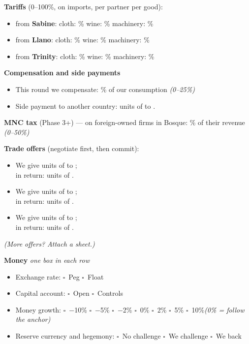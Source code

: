 \documentclass[11pt]{article}
\newcommand{\blank}[1]{\underline{\hspace{#1}}}
\newcommand{\boxx}{$\square$}
\begin{document}
{\bfseries Tariffs} (0--100\%, on imports, per partner per good):\par
\begin{itemize}[nosep,leftmargin=1.4em]
  \item from \textbf{Sabine}: \quad cloth: \blank{1.4cm}\% \quad wine: \blank{1.4cm}\% \quad machinery: \blank{1.4cm}\%
  \item from \textbf{Llano}: \quad cloth: \blank{1.4cm}\% \quad wine: \blank{1.4cm}\% \quad machinery: \blank{1.4cm}\%
  \item from \textbf{Trinity}: \quad cloth: \blank{1.4cm}\% \quad wine: \blank{1.4cm}\% \quad machinery: \blank{1.4cm}\%
\end{itemize}

{\bfseries Compensation and side payments}\par
\begin{itemize}[nosep,leftmargin=1.4em]
  \item This round we compensate: \blank{1.4cm}\% of our consumption \quad \textit{(0--25\%)}
  \item Side payment to another country: \blank{1.6cm} units of \blank{2cm} to \blank{2.2cm}.
\end{itemize}

{\bfseries MNC tax} (Phase 3+) --- on foreign-owned firms in Bosque: \blank{1.4cm}\% of their revenue \quad \textit{(0--50\%)}\par

{\bfseries Trade offers} (negotiate first, then commit):\par
\begin{itemize}[itemsep=4pt,leftmargin=1.4em]
  \item We give \blank{1.8cm} units of \blank{2.2cm} to \blank{2.2cm};\\[2pt] in return: \blank{1.8cm} units of \blank{2.2cm}.
  \item We give \blank{1.8cm} units of \blank{2.2cm} to \blank{2.2cm};\\[2pt] in return: \blank{1.8cm} units of \blank{2.2cm}.
  \item We give \blank{1.8cm} units of \blank{2.2cm} to \blank{2.2cm};\\[2pt] in return: \blank{1.8cm} units of \blank{2.2cm}.
\end{itemize}
\textit{(More offers? Attach a sheet.)}

{\bfseries Money} \hfill \textit{one box in each row}\par
\begin{itemize}[nosep,leftmargin=1.4em]
  \item Exchange rate: \quad \boxx\ Peg \quad \boxx\ Float
  \item Capital account: \quad \boxx\ Open \quad \boxx\ Controls
  \item Money growth: \quad \boxx\ $-$10\% \quad \boxx\ $-$5\% \quad \boxx\ $-$2\% \quad \boxx\ 0\% \quad \boxx\ 2\% \quad \boxx\ 5\% \quad \boxx\ 10\%\newline \textit{(0\% = follow the anchor)}
  \item Reserve currency and hegemony: \quad \boxx\ No challenge \quad \boxx\ We challenge \quad \boxx\ We back \blank{2.2cm}
\end{itemize}
\end{document}

